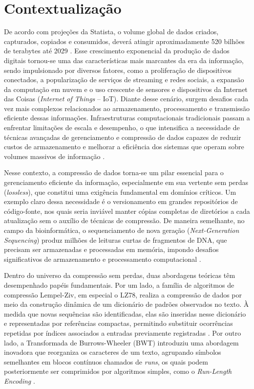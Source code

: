 \documentclass[licenciatura]{pre-projeto-computacao}
\begin{document}
\frenchspacing 
\imprimircapa
\imprimirfolhaderosto



\section*{Contextualização}

De acordo com projeções da Statista, o volume global de dados criados, capturados, copiados e consumidos, deverá atingir aproximadamente 520 bilhões de terabytes até 2029 \cite{statista2024data}.
Esse crescimento exponencial da produção de dados digitais tornou-se uma das características mais marcantes da era da informação, sendo impulsionado por diversos fatores, como a proliferação de dispositivos conectados, a popularização de serviços de streaming e redes sociais, a expansão da computação em nuvem e o uso crescente de sensores e dispositivos da Internet das Coisas (\textit{Internet of Things} -- IoT).
Diante desse cenário, surgem desafios cada vez mais complexos relacionados ao armazenamento, processamento e transmissão eficiente dessas informações.
Infraestruturas computacionais tradicionais passam a enfrentar limitações de escala e desempenho, o que intensifica a necessidade de técnicas avançadas de gerenciamento e compressão de dados capazes de reduzir custos de armazenamento e melhorar a eficiência dos sistemas que operam sobre volumes massivos de informação \cite{infinidat2026storage}.

Nesse contexto, a compressão de dados torna-se um pilar essencial para o gerenciamento eficiente da informação, especialmente em sua vertente sem perdas (\textit{lossless}), que constitui uma exigência fundamental em domínios críticos.
Um exemplo claro dessa necessidade é o versionamento em grandes repositórios de código-fonte, nos quais seria inviável manter cópias completas de diretórios a cada atualização sem o auxílio de técnicas de compressão.
De maneira semelhante, no campo da bioinformática, o sequenciamento de nova geração (\textit{Next-Generation Sequencing}) produz milhões de leituras curtas de fragmentos de DNA, que precisam ser armazenadas e processadas em memória, impondo desafios significativos de armazenamento e processamento computacional \cite{NGSBigDataHighPerformanceComputing}.

Dentro do universo da compressão sem perdas, duas abordagens teóricas têm desempenhado papéis fundamentais.
Por um lado, a família de algoritmos de compressão Lempel-Ziv, em especial o LZ78, realiza a compressão de dados por meio da construção dinâmica de um dicionário de padrões observados no texto.
À medida que novas sequências são identificadas, elas são inseridas nesse dicionário e representadas por referências compactas, permitindo substituir ocorrências repetidas por índices associados a entradas previamente registradas \cite{variableRateCodeCompression}.
Por outro lado, a Transformada de Burrows-Wheeler (BWT) introduziu uma abordagem inovadora que reorganiza os caracteres de um texto, agrupando símbolos semelhantes em blocos contínuos chamados de \textit{runs}, os quais podem posteriormente ser comprimidos por algoritmos simples, como o \textit{Run-Length Encoding} \cite{Burrows1994ABL}.
\end{document}
